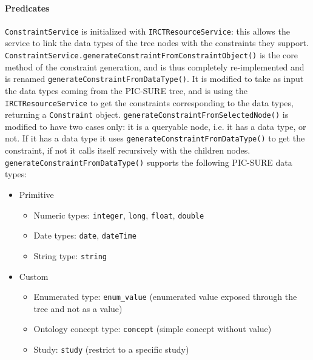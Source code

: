 \paragraph{Predicates}

\verb|ConstraintService| is initialized with \verb|IRCTResourceService|: this allows the service to link the data types of the tree nodes with the constraints they support. \\
\verb|ConstraintService.generateConstraintFromConstraintObject()| is the core method of the constraint generation, and is thus completely re-implemented and is renamed \verb|generateConstraintFromDataType()|.
It is modified to take as input the data types coming from the PIC-SURE tree, and is using the \verb|IRCTResourceService| to get the constraints corresponding to the data types, returning a \verb|Constraint| object.
\verb|generateConstraintFromSelectedNode()| is modified to have two cases only: it is a queryable node, i.e. it has a data type, or not. If it has a data type it uses \verb|generateConstraintFromDataType()| to get the constraint, if not it calls itself recursively with the children nodes.
\verb|generateConstraintFromDataType()| supports the following PIC-SURE data types:
\begin{itemize}
\item Primitive
    \begin{itemize}
        \item Numeric types: \verb|integer|, \verb|long|, \verb|float|, \verb|double|
        \item Date types: \verb|date|, \verb|dateTime|
        \item String type: \verb|string|
    \end{itemize}

\item Custom
    \begin{itemize}
        \item Enumerated type: \verb|enum_value| (enumerated value exposed through the tree and not as a value)
        \item Ontology concept type: \verb|concept| (simple concept without value)
        \item Study: \verb|study| (restrict to a specific study)
    \end{itemize}
\end{itemize}

